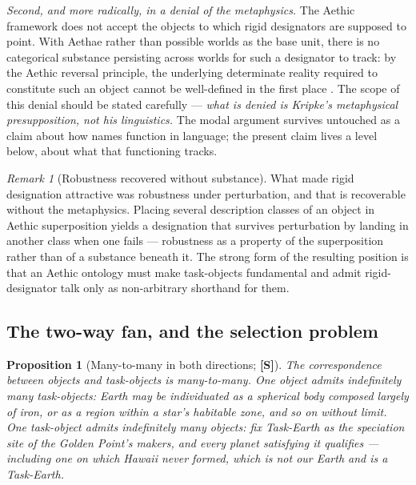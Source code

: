 \documentclass[11pt]{article}
\numberwithin{equation}{section}
\theoremstyle{plain}
\newtheorem{proposition}[theorem]{Proposition}
\theoremstyle{definition}
\theoremstyle{remark}
\newtheorem{remark}[theorem]{Remark}
\begin{document}
\emph{Second, and more radically, in a denial of the metaphysics.} The
Aethic framework does not accept the objects to which rigid designators
are supposed to point. With Aethae rather than possible worlds as the
base unit, there is no categorical substance persisting across worlds
for such a designator to track: by the Aethic reversal principle, the
underlying determinate reality required to constitute such an object
cannot be well-defined in the first place \cite{Aethus}. The scope of
this denial should be stated carefully --- \emph{what is denied is
Kripke's metaphysical presupposition, not his linguistics.} The modal
argument survives untouched as a claim about how names function in
language; the present claim lives a level below, about what that
functioning tracks.

\begin{remark}[Robustness recovered without substance]
\label{to:rem:robustness}
What made rigid designation attractive was robustness under
perturbation, and that is recoverable without the metaphysics. Placing
several description classes of an object in Aethic superposition yields
a designation that survives perturbation by landing in another class
when one fails --- robustness as a property of the superposition rather
than of a substance beneath it. The strong form of the resulting
position is that an Aethic ontology must make task-objects fundamental
and admit rigid-designator talk only as non-arbitrary shorthand for
them.
\end{remark}

\subsection{The two-way fan, and the selection problem}
\label{to:sub:selection}

\begin{proposition}[Many-to-many in both directions; \textbf{[S]}]
\label{to:prop:fan}
The correspondence between objects and task-objects is many-to-many.
One object admits indefinitely many task-objects: Earth may be
individuated as a spherical body composed largely of iron, or as a
region within a star's habitable zone, and so on without limit. One
task-object admits indefinitely many objects: fix Task-Earth as the
speciation site of the Golden Point's makers, and every planet
satisfying it qualifies --- including one on which Hawaii never formed,
which is not our Earth and is a Task-Earth.
\end{proposition}
\end{document}
